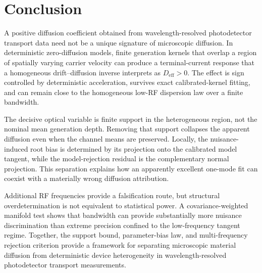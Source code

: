 \documentclass[aps,pra,twocolumn,superscriptaddress,nofootinbib]{revtex4-2}
\newcommand{\Deff}{D_{\mathrm{eff}}}
\begin{document}
\section{Conclusion}

A positive diffusion coefficient obtained from wavelength-resolved photodetector transport data need not be a unique signature of microscopic diffusion. In deterministic zero-diffusion models, finite generation kernels that overlap a region of spatially varying carrier velocity can produce a terminal-current response that a homogeneous drift--diffusion inverse interprets as $\Deff>0$. The effect is sign controlled by deterministic acceleration, survives exact calibrated-kernel fitting, and can remain close to the homogeneous low-RF dispersion law over a finite bandwidth.

The decisive optical variable is finite support in the heterogeneous region, not the nominal mean generation depth. Removing that support collapses the apparent diffusion even when the channel means are preserved. Locally, the nuisance-induced root bias is determined by its projection onto the calibrated model tangent, while the model-rejection residual is the complementary normal projection. This separation explains how an apparently excellent one-mode fit can coexist with a materially wrong diffusion attribution.

Additional RF frequencies provide a falsification route, but structural overdetermination is not equivalent to statistical power. A covariance-weighted manifold test shows that bandwidth can provide substantially more nuisance discrimination than extreme precision confined to the low-frequency tangent regime. Together, the support bound, parameter-bias law, and multi-frequency rejection criterion provide a framework for separating microscopic material diffusion from deterministic device heterogeneity in wavelength-resolved photodetector transport measurements.



\end{document}
